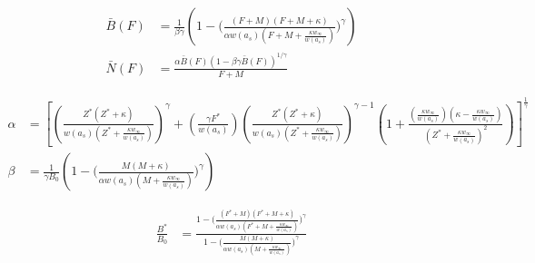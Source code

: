 \documentclass[ xcolor = pdftex, dvipsnames, table ]{beamer}
\newcommand{\kr}{ \frac{\kappa w_\infty}{w(a_s)} }
\newcommand{\one}{
        \left(\frac{Z(Z+\kappa)}{\alpha w(a_s)(Z+\kr)}\right)^\gamma
}
\newcommand{\two}{
        \left(\frac{\gamma F}{\alpha w(a_s)}\right) \left(\frac{Z(Z+\kappa)}{\alpha w(a_s)(Z+\kr)}\right)^{\gamma-1}
}
\newcommand{\thr}{
        \frac{\left(\kr\right)\left(\kappa-\kr\right)}{(Z+\kr)^2}
}
\newcommand{\oneA}{
        \left(\frac{Z^*(Z^*+\kappa)}{w(a_s)(Z^*+\kr)}\right)^\gamma
}
\newcommand{\twoA}{
        \left(\frac{\gamma F^*}{w(a_s)}\right) \left(\frac{Z^*(Z^*+\kappa)}{w(a_s)(Z^*+\kr)}\right)^{\gamma-1}
}
\newcommand{\thrA}{
        \frac{\left(\kr\right)\left(\kappa-\kr\right)}{(Z^*+\kr)^2}
}
\begin{document}
%
\begin{frame}
%
\begin{align}
\bar{B}(F) &= \frac{1}{\beta\gamma} \left( 1 - \Big(\frac{(F + M) (F + M + \kappa)}{\alpha w(a_s)(F + M + \kr)}\Big)^\gamma\right) \label{BF}\\
\bar{N}(F) &= \frac{\alpha\bar{B}(F)(1-\beta\gamma\bar{B}(F))^{1/\gamma}}{F+M} \label{NF}
\end{align}


%
\begingroup
\tiny
\begin{align}
\alpha & = \left[ \oneA + \twoA \left( 1 + \thrA \right) \right]^{\frac{1}{\gamma}} \label{aDelay}\\
\beta &= \frac{1}{\gamma B_0} \left( 1 - \Big(\frac{M (M + \kappa)}{\alpha w(a_s)(M + \kr)}\Big)^\gamma\right) \label{bDelay}%
\end{align}
\endgroup

\begin{align}
\frac{B^*}{B_0} &= \frac{ 1 - \Big(\frac{(F^* + M) (F^* + M + \kappa)}{\alpha w(a_s)(F^* + M + \kr)}\Big)^\gamma }{ 1 - \Big(\frac{M (M + \kappa)}{\alpha w(a_s)(M + \kr)}\Big)^\gamma }
\label{gDelay}
\end{align}

\end{frame}
\end{document}
